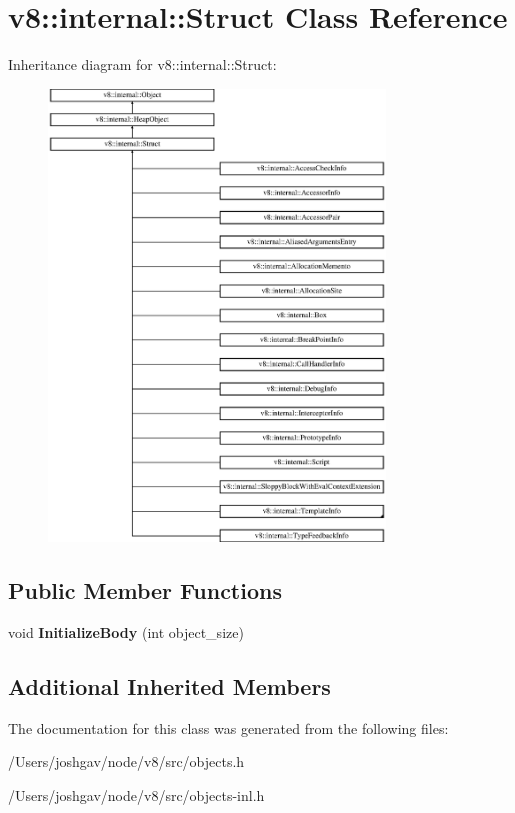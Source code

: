 \hypertarget{classv8_1_1internal_1_1_struct}{}\section{v8\+:\+:internal\+:\+:Struct Class Reference}
\label{classv8_1_1internal_1_1_struct}
Inheritance diagram for v8\+:\+:internal\+:\+:Struct\+:\begin{figure}[H]
\begin{center}
\leavevmode
\includegraphics[height=12.000000cm]{classv8_1_1internal_1_1_struct}
\end{center}
\end{figure}
\subsection*{Public Member Functions}
\begin{DoxyCompactItemize}
\item 
void {\bfseries Initialize\+Body} (int object\+\_\+size)\hypertarget{classv8_1_1internal_1_1_struct_a301776b4c2188645d8f6bec5093dd85d}{}\label{classv8_1_1internal_1_1_struct_a301776b4c2188645d8f6bec5093dd85d}

\end{DoxyCompactItemize}
\subsection*{Additional Inherited Members}


The documentation for this class was generated from the following files\+:\begin{DoxyCompactItemize}
\item 
/\+Users/joshgav/node/v8/src/objects.\+h\item 
/\+Users/joshgav/node/v8/src/objects-\/inl.\+h\end{DoxyCompactItemize}
